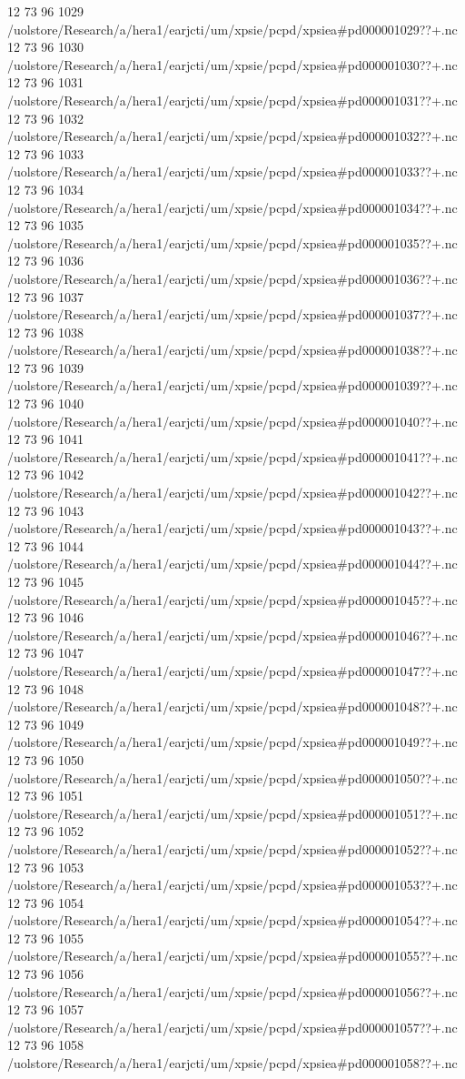 12 73 96
1029
/uolstore/Research/a/hera1/earjcti/um/xpsie/pcpd/xpsiea#pd000001029??+.nc
12 73 96
1030
/uolstore/Research/a/hera1/earjcti/um/xpsie/pcpd/xpsiea#pd000001030??+.nc
12 73 96
1031
/uolstore/Research/a/hera1/earjcti/um/xpsie/pcpd/xpsiea#pd000001031??+.nc
12 73 96
1032
/uolstore/Research/a/hera1/earjcti/um/xpsie/pcpd/xpsiea#pd000001032??+.nc
12 73 96
1033
/uolstore/Research/a/hera1/earjcti/um/xpsie/pcpd/xpsiea#pd000001033??+.nc
12 73 96
1034
/uolstore/Research/a/hera1/earjcti/um/xpsie/pcpd/xpsiea#pd000001034??+.nc
12 73 96
1035
/uolstore/Research/a/hera1/earjcti/um/xpsie/pcpd/xpsiea#pd000001035??+.nc
12 73 96
1036
/uolstore/Research/a/hera1/earjcti/um/xpsie/pcpd/xpsiea#pd000001036??+.nc
12 73 96
1037
/uolstore/Research/a/hera1/earjcti/um/xpsie/pcpd/xpsiea#pd000001037??+.nc
12 73 96
1038
/uolstore/Research/a/hera1/earjcti/um/xpsie/pcpd/xpsiea#pd000001038??+.nc
12 73 96
1039
/uolstore/Research/a/hera1/earjcti/um/xpsie/pcpd/xpsiea#pd000001039??+.nc
12 73 96
1040
/uolstore/Research/a/hera1/earjcti/um/xpsie/pcpd/xpsiea#pd000001040??+.nc
12 73 96
1041
/uolstore/Research/a/hera1/earjcti/um/xpsie/pcpd/xpsiea#pd000001041??+.nc
12 73 96
1042
/uolstore/Research/a/hera1/earjcti/um/xpsie/pcpd/xpsiea#pd000001042??+.nc
12 73 96
1043
/uolstore/Research/a/hera1/earjcti/um/xpsie/pcpd/xpsiea#pd000001043??+.nc
12 73 96
1044
/uolstore/Research/a/hera1/earjcti/um/xpsie/pcpd/xpsiea#pd000001044??+.nc
12 73 96
1045
/uolstore/Research/a/hera1/earjcti/um/xpsie/pcpd/xpsiea#pd000001045??+.nc
12 73 96
1046
/uolstore/Research/a/hera1/earjcti/um/xpsie/pcpd/xpsiea#pd000001046??+.nc
12 73 96
1047
/uolstore/Research/a/hera1/earjcti/um/xpsie/pcpd/xpsiea#pd000001047??+.nc
12 73 96
1048
/uolstore/Research/a/hera1/earjcti/um/xpsie/pcpd/xpsiea#pd000001048??+.nc
12 73 96
1049
/uolstore/Research/a/hera1/earjcti/um/xpsie/pcpd/xpsiea#pd000001049??+.nc
12 73 96
1050
/uolstore/Research/a/hera1/earjcti/um/xpsie/pcpd/xpsiea#pd000001050??+.nc
12 73 96
1051
/uolstore/Research/a/hera1/earjcti/um/xpsie/pcpd/xpsiea#pd000001051??+.nc
12 73 96
1052
/uolstore/Research/a/hera1/earjcti/um/xpsie/pcpd/xpsiea#pd000001052??+.nc
12 73 96
1053
/uolstore/Research/a/hera1/earjcti/um/xpsie/pcpd/xpsiea#pd000001053??+.nc
12 73 96
1054
/uolstore/Research/a/hera1/earjcti/um/xpsie/pcpd/xpsiea#pd000001054??+.nc
12 73 96
1055
/uolstore/Research/a/hera1/earjcti/um/xpsie/pcpd/xpsiea#pd000001055??+.nc
12 73 96
1056
/uolstore/Research/a/hera1/earjcti/um/xpsie/pcpd/xpsiea#pd000001056??+.nc
12 73 96
1057
/uolstore/Research/a/hera1/earjcti/um/xpsie/pcpd/xpsiea#pd000001057??+.nc
12 73 96
1058
/uolstore/Research/a/hera1/earjcti/um/xpsie/pcpd/xpsiea#pd000001058??+.nc
